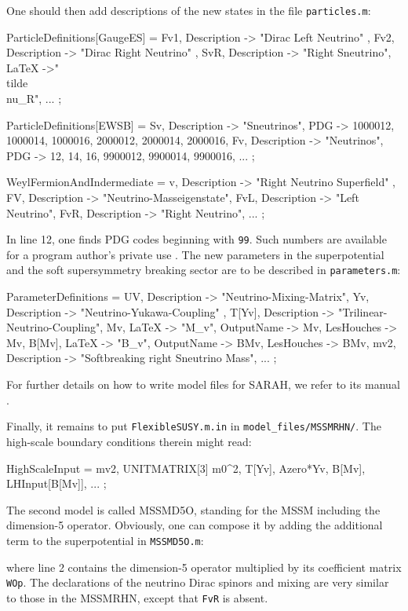 \documentclass[final,3p,11pt,pdflatex]{elsarticle}
\makeatletter
\newcommand{\sarah}{SARAH\@\xspace}
\newcommand{\code}[1]{\lstinline|#1|}  %
\makeatother
\begin{document}
One should then add descriptions of the new states in the file
\code{particles.m}:
\begin{numlstlisting}
ParticleDefinitions[GaugeES] = {
  {Fv1, { Description -> "Dirac Left Neutrino" }},
  {Fv2, { Description -> "Dirac Right Neutrino" }},
  {SvR, { Description -> "Right Sneutrino", LaTeX ->"\\tilde{\\nu}_R"}},
  ...
};

ParticleDefinitions[EWSB] = {
  {Sv, { Description -> "Sneutrinos",
         PDG -> {1000012, 1000014, 1000016, 2000012, 2000014, 2000016}}},
  {Fv, { Description -> "Neutrinos",
         PDG -> {12, 14, 16, 9900012, 9900014, 9900016}}},
  ...
};

WeylFermionAndIndermediate = {
  {v,   { Description -> "Right Neutrino Superfield" }},
  {FV,  { Description -> "Neutrino-Masseigenstate"}},
  {FvL, { Description -> "Left Neutrino"}},
  {FvR, { Description -> "Right Neutrino"}},
  ...
};
\end{numlstlisting}
In line 12, one finds PDG codes beginning with \code{99}.
Such numbers are available for a program author's private use
\cite{Beringer:1900zz}.
The new parameters in the superpotential
and the soft supersymmetry breaking sector
are to be described in \code{parameters.m}:
\begin{numlstlisting}
ParameterDefinitions = {
  {UV,    { Description -> "Neutrino-Mixing-Matrix"}},
  {Yv,    { Description -> "Neutrino-Yukawa-Coupling" }},
  {T[Yv], { Description -> "Trilinear-Neutrino-Coupling"}},
  {Mv,    { LaTeX -> "M_v", OutputName -> Mv, LesHouches -> Mv}},
  {B[Mv], { LaTeX -> "B_v", OutputName -> BMv, LesHouches -> BMv}},
  {mv2,   { Description -> "Softbreaking right Sneutrino Mass"}},
  ...
};
\end{numlstlisting}
For further details on how to write model files for \sarah, we refer
to its manual \cite{Staub:2008uz,Staub:2013tta}.

Finally, it remains to put \code{FlexibleSUSY.m.in}
in \code{model_files/MSSMRHN/}.
The high-scale boundary conditions therein might read:
\begin{numlstlisting}
HighScaleInput = {
  {mv2, UNITMATRIX[3] m0^2},
  {T[Yv], Azero*Yv},
  {B[Mv], LHInput[B[Mv]]},
  ...
};
\end{numlstlisting}

The second model is called MSSMD5O, standing for
the MSSM including the dimension-5 operator.
Obviously, one can compose it by adding
the additional term to the superpotential in \code{MSSMD5O.m}:
\begin{numlstlisting}
SuperPotential = Yu u.q.Hu - Yd d.q.Hd - Ye e.l.Hd + \[Mu] Hu.Hd \
               + WOp/2 l.Hu.l.Hu;
\end{numlstlisting}
where line 2 contains the dimension-5 operator
multiplied by its coefficient matrix \code{WOp}.
The declarations of the neutrino Dirac spinors and mixing are
very similar to those in the MSSMRHN,
except that \code{FvR} is absent.
\end{document}

